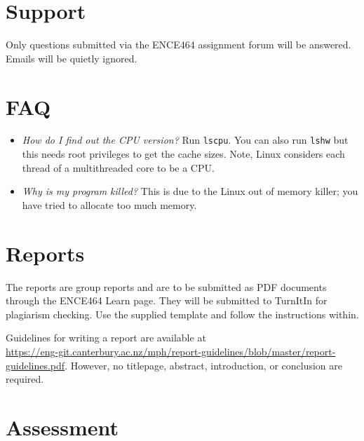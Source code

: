 \documentclass[a4paper,11pt]{article}
\newcommand{\code}[1]{\texttt{#1}}
\begin{document}
\section{Support}

Only questions submitted via the ENCE464 assignment forum will be
answered.  Emails will be quietly ignored.


\section{FAQ}

\begin{itemize}
\item \emph{How do I find out the CPU version?}  Run \code{lscpu}.
  You can also run \code{lshw} but this needs root privileges to get
  the cache sizes.  Note, Linux considers each thread of a
  multithreaded core to be a CPU.

\item \emph{Why is my program killed?}  This is due to the Linux out
  of memory killer; you have tried to allocate too much memory.

\end{itemize}



\section{Reports}

The reports are group reports and are to be submitted as PDF documents
through the ENCE464 Learn page.  They will be submitted to TurnItIn
for plagiarism checking.  Use the supplied template and follow the
instructions within.

Guidelines for writing a report are available
at\\ \url{https://eng-git.canterbury.ac.nz/mph/report-guidelines/blob/master/report-guidelines.pdf}.
However, no titlepage, abstract, introduction, or conclusion are
required.


\section{Assessment}
\end{document}
